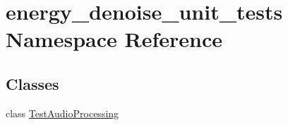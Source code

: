 \hypertarget{namespaceenergy__denoise__unit__tests}{\section{energy\-\_\-denoise\-\_\-unit\-\_\-tests Namespace Reference}
\label{namespaceenergy__denoise__unit__tests}
}
\subsection*{Classes}
\begin{DoxyCompactItemize}
\item 
class \hyperlink{classenergy__denoise__unit__tests_1_1TestAudioProcessing}{Test\-Audio\-Processing}
\end{DoxyCompactItemize}
